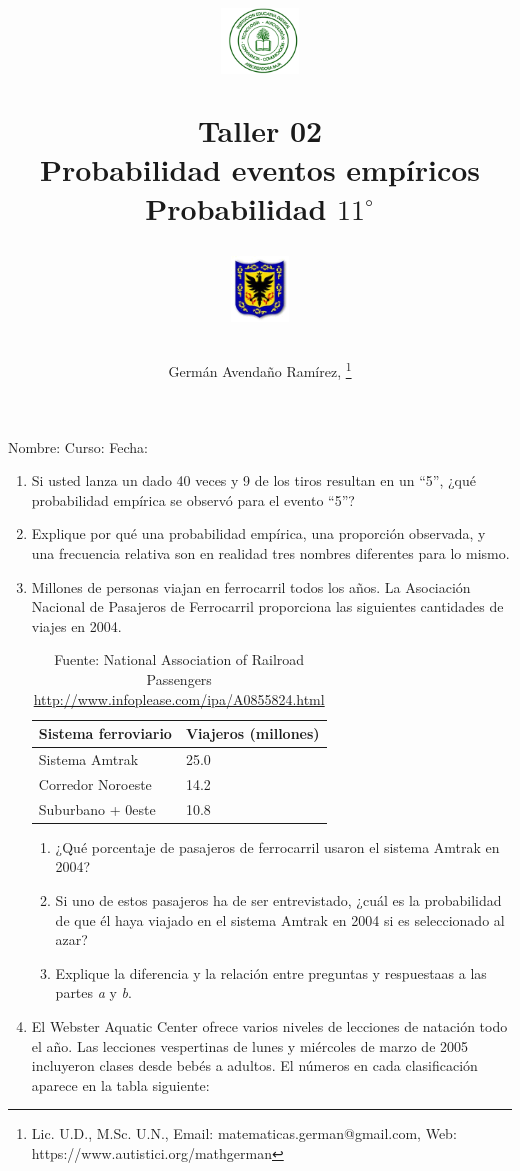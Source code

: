 \documentclass[11pt,twoside]{article}
\author{Germ\'an Avenda\~no Ram\'irez, \thanks{Lic. U.D., M.Sc. U.N., Email: matematicas.german@gmail.com, Web: https://www.autistici.org/mathgerman}}
\title{\begin{minipage}{.2\textwidth}
\includegraphics[height=1.75cm]{Images/logo-colegio.png}\end{minipage}
\begin{minipage}{.55\textwidth}
\begin{center}
Taller 02\\
Probabilidad eventos empíricos\\
Probabilidad $11^{\circ}$
\end{center}
\end{minipage}\hfill
\begin{minipage}{.2\textwidth}
\includegraphics[height=1.75cm]{Images/logo-sed.png} 
\end{minipage}}
\date{}
\begin{document}
\maketitle
Nombre: \hrulefill Curso: \underline{\hspace*{44pt}} Fecha: \underline{\hspace*{2.5cm}}
 \begin{enumerate}
  \item Si usted lanza un dado 40 veces y 9 de los tiros resultan en un ``5'', ¿qué probabilidad empírica se observó para el evento ``5''?
  \item Explique por qué una probabilidad empírica, una proporción observada, y una frecuencia relativa son en realidad tres nombres diferentes para lo mismo.
  \item Millones de personas viajan en ferrocarril todos los años. La Asociación Nacional de Pasajeros de Ferrocarril proporciona las siguientes cantidades de viajes en 2004.
  \begin{table}[h!]
\begin{center}
\begin{tabular}{ll}
Sistema ferroviario & Viajeros (millones)\\ \hline
Sistema Amtrak & 25.0\\
Corredor Noroeste & 14.2\\
Suburbano + 0este & 10.8 \\ \hline
  \end{tabular}\caption{Fuente: National Association of Railroad Passengers \url{http://www.infoplease.com/ipa/A0855824.html}}
  \end{center}
              \end{table} 
\begin{enumerate}
 \item ¿Qué porcentaje de pasajeros de ferrocarril usaron
el sistema Amtrak en 2004?
\item Si uno de estos pasajeros ha de ser entrevistado, ¿cuál es la probabilidad de que él haya viajado en el sistema Amtrak en 2004 si es seleccionado al azar?
\item Explique la diferencia y la relación entre preguntas y respuestaas  a las partes \textit{a} y \textit{b}.
\end{enumerate}
\item El Webster Aquatic Center ofrece varios niveles de lecciones de natación todo el año. Las lecciones vespertinas de lunes y miércoles de marzo de 2005 incluyeron clases desde bebés a adultos. El números en cada clasificación aparece en la tabla siguiente:

\end{enumerate}
\end{document}
